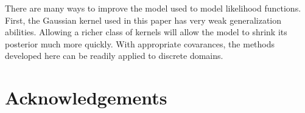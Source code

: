 \documentclass{article}
\begin{document}


There are many ways to improve the \gpb model used to model likelihood functions.  First, the Gaussian kernel used in this paper has very weak generalization abilities.  Allowing a richer class of kernels will allow the \gpb model to shrink its posterior much more quickly. With appropriate covarances, the methods developed here can be readily applied to discrete domains.







\section*{Acknowledgements}



\pagebreak
%
%
\end{document}
